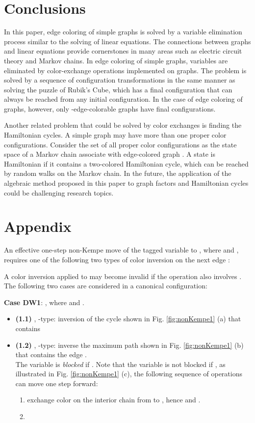 \documentclass[11pt]{article}
\begin{document}
\section{Conclusions}

In this paper, edge coloring of simple graphs is solved by a variable elimination process similar to the solving of linear equations. The connections between graphs and linear equations provide cornerstones in many areas such as electric circuit theory and Markov chains. In edge coloring of simple graphs, variables are eliminated by color-exchange operations implemented on graphs. The problem is solved by a sequence of configuration transformations in the same manner as solving the puzzle of Rubik's Cube, which has a final configuration that can always be reached from any initial configuration. In the case of edge coloring of graphs, however, only -edge-colorable graphs have final configurations.

Another related problem that could be solved by color exchanges is finding the Hamiltonian cycles. A simple graph  may have more than one proper color configurations. Consider the set of all proper color configurations as the state space of a Markov chain associate with edge-colored graph . A state is Hamiltonian if it contains a two-colored Hamiltonian cycle, which can be reached by random walks on the Markov chain. In the future, the application of the algebraic method proposed in this paper to graph factors and Hamiltonian cycles could be challenging research topics.  






 

\section*{Appendix}

An effective one-step non-Kempe move of the tagged variable   to , where  and , requires one of the following two types of color inversion on the next edge : 

A color inversion applied to  may become invalid if the operation also involves . The following two cases are considered in a canonical configuration:

{\bf Case DW1}:  , where  and .
\begin{itemize}  
\itemsep -2pt \item {\bf (1.1)} , -type: inversion of the  cycle  shown in Fig. \ref{fig:nonKempe1} (a) that contains 
\item {\bf (1.2)} , -type: inverse the maximum  path  shown in Fig. \ref{fig:nonKempe1} (b) that contains the edge .\\
The variable  is {\it blocked} if . Note that the variable   is not blocked if , as illustrated in Fig. \ref{fig:nonKempe1} (c), the following sequence of operations can move  one step forward:
\begin{enumerate}
\itemsep -2pt \item exchange color on the interior chain from  to , hence  and .
\item 
\end{enumerate}
\end{itemize}
\end{document}
